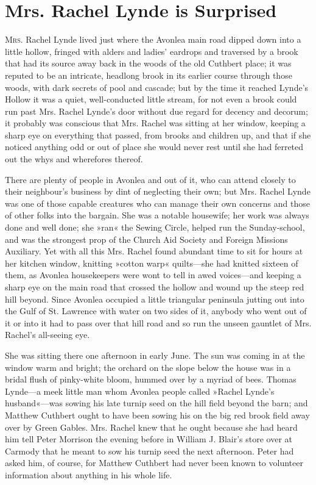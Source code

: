 \chapter{Mrs. Rachel Lynde is Surprised}

\lettrine[lines=4]{M}{rs}. Rachel Lynde lived just where the Avonlea main road dipped down into a little hollow, fringed with alders and ladies' eardrops and traversed by a brook that had its source away back in the woods of the old Cuthbert place; it was reputed to be an intricate, headlong brook in its earlier course through those woods, with dark secrets of pool and cascade; but by the time it reached Lynde's Hollow it was a quiet, well-conducted little stream, for not even a brook could run past Mrs. Rachel Lynde's door without due regard for decency and decorum; it probably was conscious that Mrs. Rachel was sitting at her window, keeping a sharp eye on everything that passed, from brooks and children up, and that if she noticed anything odd or out of place she would never rest until she had ferreted out the whys and wherefores thereof.

There are plenty of people in Avonlea and out of it, who can attend closely to their neighbour's business by dint of neglecting their own; but Mrs. Rachel Lynde was one of those capable creatures who can manage their own concerns and those of other folks into the bargain. She was a notable housewife; her work was always done and well done; she »ran« the Sewing Circle, helped run the Sunday-school, and was the strongest prop of the Church Aid Society and Foreign Missions Auxiliary. Yet with all this Mrs. Rachel found abundant time to sit for hours at her kitchen window, knitting »cotton warp« quilts—she had knitted sixteen of them, as Avonlea housekeepers were wont to tell in awed voices—and keeping a sharp eye on the main road that crossed the hollow and wound up the steep red hill beyond. Since Avonlea occupied a little triangular peninsula jutting out into the Gulf of St. Lawrence with water on two sides of it, anybody who went out of it or into it had to pass over that hill road and so run the unseen gauntlet of Mrs. Rachel's all-seeing eye.

She was sitting there one afternoon in early June. The sun was coming in at the window warm and bright; the orchard on the slope below the house was in a bridal flush of pinky-white bloom, hummed over by a myriad of bees. Thomas Lynde—a meek little man whom Avonlea people called »Rachel Lynde's husband«—was sowing his late turnip seed on the hill field beyond the barn; and Matthew Cuthbert ought to have been sowing his on the big red brook field away over by Green Gables. Mrs. Rachel knew that he ought because she had heard him tell Peter Morrison the evening before in William J. Blair's store over at Carmody that he meant to sow his turnip seed the next afternoon. Peter had asked him, of course, for Matthew Cuthbert had never been known to volunteer information about anything in his whole life.

